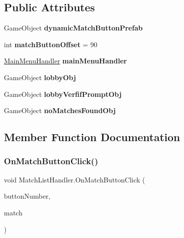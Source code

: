 \subsection*{Public Attributes}
\begin{DoxyCompactItemize}
\item 
\hypertarget{class_match_list_handler_a9b7ed8e3520a896727cfcfef49b7c39d}{}\label{class_match_list_handler_a9b7ed8e3520a896727cfcfef49b7c39d} 
Game\+Object {\bfseries dynamic\+Match\+Button\+Prefab}
\item 
\hypertarget{class_match_list_handler_a0979502a2b7f48aed7ac69c2babd0a3c}{}\label{class_match_list_handler_a0979502a2b7f48aed7ac69c2babd0a3c} 
int {\bfseries match\+Button\+Offset} = 90
\item 
\hypertarget{class_match_list_handler_a4021c46069a0cef33540e6c88eb98e7d}{}\label{class_match_list_handler_a4021c46069a0cef33540e6c88eb98e7d} 
\hyperlink{class_main_menu_handler}{Main\+Menu\+Handler} {\bfseries main\+Menu\+Handler}
\item 
\hypertarget{class_match_list_handler_aad42bda5169fea1d4cbba7ef38923c4a}{}\label{class_match_list_handler_aad42bda5169fea1d4cbba7ef38923c4a} 
Game\+Object {\bfseries lobby\+Obj}
\item 
\hypertarget{class_match_list_handler_aa8aa8947dc0aa0e2c4c397813f46f858}{}\label{class_match_list_handler_aa8aa8947dc0aa0e2c4c397813f46f858} 
Game\+Object {\bfseries lobby\+Verfif\+Prompt\+Obj}
\item 
\hypertarget{class_match_list_handler_a1eab67138b246610dd8fda0f922f5dea}{}\label{class_match_list_handler_a1eab67138b246610dd8fda0f922f5dea} 
Game\+Object {\bfseries no\+Matches\+Found\+Obj}
\end{DoxyCompactItemize}


\subsection{Member Function Documentation}
\hypertarget{class_match_list_handler_a19cbf24b2e0caf778f85f7df1c2d8cf3}{}\label{class_match_list_handler_a19cbf24b2e0caf778f85f7df1c2d8cf3} 
\subsubsection{\texorpdfstring{On\+Match\+Button\+Click()}{OnMatchButtonClick()}}
{\footnotesize\ttfamily void Match\+List\+Handler.\+On\+Match\+Button\+Click (\begin{DoxyParamCaption}\item[{int}]{button\+Number,  }\item[{Unity\+Engine.\+Networking.\+Match.\+Match\+Info\+Snapshot}]{match }\end{DoxyParamCaption})}




